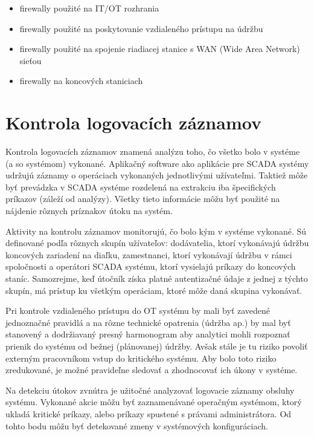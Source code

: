 \begin{itemize}
\item firewally  použité na IT/OT rozhrania
\item firewally použité na poskytovanie vzdialeného prístupu na údržbu
\item firewally použité na spojenie riadiacej stanice s WAN (Wide Area Network) sieťou
\item firewally na koncových staniciach\cite{Security}
\end{itemize}

\section{Kontrola logovacích záznamov}
\tab Kontrola logovacích záznamov znamená analýzu toho, čo všetko bolo v systéme (a so systémom) vykonané. Aplikačný software ako aplikácie pre SCADA systémy udržujú záznamy o operáciach vykonaných jednotlivými užívateľmi. Taktiež môže byť prevádzka v SCADA systéme rozdelená na extrakciu iba špecifických príkazov (záleží od analýzy). Všetky tieto informácie môžu byť použité na nájdenie rôznych príznakov útoku na systém. \par
Aktivity na kontrolu záznamov monitorujú, čo bolo kým v systéme vykonané. Sú definované podľa rôznych skupín užívateľov: dodávatelia, ktorí vykonávajú údržbu koncových zariadení na diaľku, zamestnanci, ktorí vykonávají údržbu v rámci spoločnosti a operátori SCADA systému, ktorí vysielajú príkazy do koncových staníc. Samozrejme, keď útočník získa platné autentizačné údaje z jednej z týchto skupín, má prístup ku všetkým operáciam, ktoré môže daná skupina vykonávať. \par
Pri kontrole vzdialeného prístupu do OT systému by mali byť zavedené jednoznačné pravidlá a na rôzne technické opatrenia (údržba ap.) by mal byť stanovený a dodržiavaný presný harmonogram aby analytici mohli rozpoznať prienik do systému od bežnej (plánovanej) údržby. Avšak stále je tu riziko povoliť externým pracovníkom vstup do kritického systému. Aby bolo toto riziko zredukované, je možné pravideľne sledovať a zhodnocovať ich úkony v systéme. \par
Na detekciu útokov zvnútra je užitočné analyzovať logovacie záznamy obsluhy systému. Vykonané akcie môžu byť zaznamenávané operačným systémom, ktorý ukladá kritické príkazy, alebo príkazy spustené s právami administrátora. Od tohto bodu môžu byť detekované zmeny v systémových konfiguráciach\cite{Security}. \par

